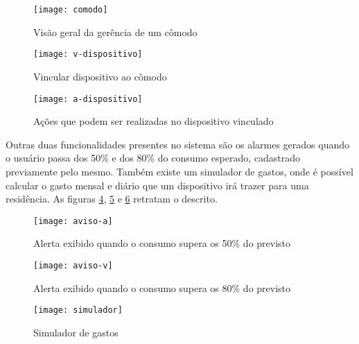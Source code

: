 \begin{figure}[h!]
	\texttt{[image: comodo]}
	\centering
	\caption[Visão geral da gerência de um cômodo]{Visão geral da gerência de um cômodo}
	\label{fig:comodo-ft} 
\end{figure}
\FloatBarrier

\begin{figure}[h!]
	\texttt{[image: v-dispositivo]}
	\centering
	\caption[Vincular dispositivo ao cômodo]{Vincular dispositivo ao cômodo}
	\label{fig:v-dispositivo} 
\end{figure}
\FloatBarrier

\begin{figure}[h!]
	\texttt{[image: a-dispositivo]}
	\centering
	\caption[Ações que podem ser realizadas no dispositivo vinculado]{Ações que podem ser realizadas no dispositivo vinculado}
	\label{fig:a-dispositivo} 
\end{figure}
\FloatBarrier

Outras duas funcionalidades presentes no sistema são os alarmes gerados quando o usuário passa dos 50\% e dos 80\% do consumo esperado, cadastrado previamente pelo mesmo.
Também existe um simulador de gastos, onde é possível calcular o gasto mensal e diário que um dispositivo irá trazer para uma residência. As figuras
\ref{fig:aviso-a}, \ref{fig:aviso-v} e \ref{fig:simulador} retratam o descrito.

\begin{figure}[h!]
	\texttt{[image: aviso-a]}
	\centering
	\caption[Alerta exibido quando o consumo supera os 50\% do previsto]{Alerta exibido quando o consumo supera os 50\% do previsto}
	\label{fig:aviso-a} 
\end{figure}
\FloatBarrier

\begin{figure}[h!]
	\texttt{[image: aviso-v]}
	\centering
	\caption[Alerta exibido quando o consumo supera os 80\% do previsto]{Alerta exibido quando o consumo supera os 80\% do previsto}
	\label{fig:aviso-v} 
\end{figure}
\FloatBarrier

\begin{figure}[h!]
	\texttt{[image: simulador]}
	\centering
	\caption[Simulador de gastos]{Simulador de gastos}
	\label{fig:simulador} 
\end{figure}
\FloatBarrier

